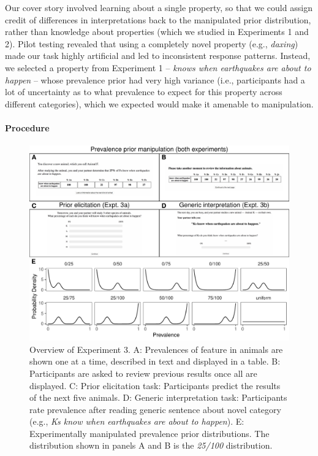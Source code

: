 \documentclass[floatsintext,doc]{apa6}
\let\oldparagraph\paragraph
\renewcommand{\paragraph}[1]{\oldparagraph{#1}\mbox{}}
\newcommand{\mht}[1]{{\textcolor{Blue}{[mht: #1]}}}
\begin{document}
Our cover story involved learning about a single property, so that we could assign credit of differences in interpretations back to the manipulated prior distribution, rather than knowledge about properties (which we studied in Experiments 1 and 2). 
Pilot testing revealed that using a completely novel property (e.g., \emph{daxing}) made our task highly artificial and led to inconsistent response patterns. 
Instead, we selected a property from Experiment 1 --  \emph{knows when earthquakes are about to happen} -- whose prevalence prior had very high variance (i.e., participants had a lot of uncertainty as to what prevalence to expect for this property across different categories), which we expected would make it amenable to manipulation.

\hypertarget{procedure}{%
\paragraph{Procedure}\label{procedure}}
%
\begin{figure}
\centering
\includegraphics{figs/expt2-overview.pdf}
\caption{\label{fig:priorManipulationExpt}Overview of Experiment 3. A: Prevalences of feature in animals are shown one at a time, described in text and displayed in a table. B: Participants are asked to review previous results once all are displayed. C: Prior elicitation task: Participants predict the results of the next five animals. D: Generic interpretation task: Participants rate prevalence after reading generic sentence about novel category (e.g., \emph{Ks know when earthquakes are about to happen}). E: Experimentally manipulated prevalence prior distributions. The distribution shown in panels A and B is the \emph{25/100} distribution.}
\end{figure}
\end{document}
